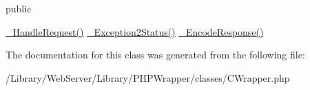 public

\hyperlink{class_c_wrapper_a12c1dd1f1d1cf0ae889cc19ff17ced0e}{\-\_\-\-Handle\-Request()}  \hyperlink{class_c_wrapper_ad8dd05c155df0d8fe19be35d4bb67b56}{\-\_\-\-Exception2\-Status()}  \hyperlink{class_c_wrapper_a60583bacf329d484d01df9851602759f}{\-\_\-\-Encode\-Response()} 

The documentation for this class was generated from the following file\-:\begin{DoxyCompactItemize}
\item 
/\-Library/\-Web\-Server/\-Library/\-P\-H\-P\-Wrapper/classes/C\-Wrapper.\-php\end{DoxyCompactItemize}
